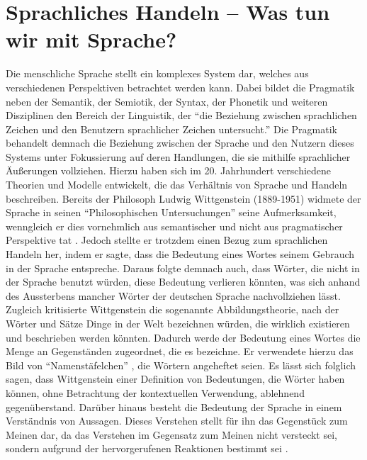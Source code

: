 \section{Sprachliches Handeln – Was tun wir mit Sprache?}
Die menschliche Sprache stellt ein komplexes System dar, welches aus verschiedenen Perspektiven betrachtet werden kann.
Dabei bildet die Pragmatik neben der Semantik, der Semiotik, der Syntax, der Phonetik und weiteren Disziplinen den Bereich der Linguistik, der "`die Beziehung zwischen sprachlichen Zeichen und den Benutzern sprachlicher Zeichen untersucht."' \cite{Dud14b}
Die Pragmatik behandelt demnach die Beziehung zwischen der Sprache und den Nutzern dieses Systems unter Fokussierung auf deren Handlungen, die sie mithilfe sprachlicher Äußerungen vollziehen.
Hierzu haben sich im 20. Jahrhundert verschiedene Theorien und Modelle entwickelt, die das Verhältnis von Sprache und Handeln beschreiben.
Bereits der Philosoph Ludwig Wittgenstein (1889-1951) widmete der Sprache in seinen "`Philosophischen Untersuchungen"' seine Aufmerksamkeit, wenngleich er dies vornehmlich aus semantischer und nicht aus pragmatischer Perspektive tat \cite[S. 63]{PA99}.
Jedoch stellte er trotzdem einen Bezug zum sprachlichen Handeln her, indem er sagte, dass die Bedeutung eines Wortes seinem Gebrauch in der Sprache entspreche.
Daraus folgte demnach auch, dass Wörter, die nicht in der Sprache benutzt würden, diese Bedeutung verlieren könnten, was sich anhand des Aussterbens mancher Wörter der deutschen Sprache nachvollziehen lässt.
Zugleich kritisierte Wittgenstein die sogenannte Abbildungstheorie, nach der Wörter und Sätze Dinge in der Welt bezeichnen würden, die wirklich existieren und beschrieben werden könnten.
Dadurch werde der Bedeutung eines Wortes die Menge an Gegenständen zugeordnet, die es bezeichne.
Er verwendete hierzu das Bild von "`Namenstäfelchen"' \cite[S. 64]{PA99}, die Wörtern angeheftet seien.
Es lässt sich folglich sagen, dass Wittgenstein einer Definition von Bedeutungen, die Wörter haben können, ohne Betrachtung der kontextuellen Verwendung, ablehnend gegenüberstand.
Darüber hinaus besteht die Bedeutung der Sprache in einem Verständnis von Aussagen.
Dieses Verstehen stellt für ihn das Gegenstück zum Meinen dar, da das Verstehen im Gegensatz zum Meinen nicht versteckt sei, sondern aufgrund der hervorgerufenen Reaktionen bestimmt sei \cite[S. 68]{PA99}.

